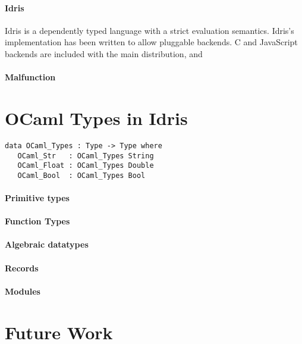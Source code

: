 \documentclass[a4paper,twocolumn]{article}
\begin{document}
\paragraph{Idris}

Idris \cite{idris} is a dependently typed language with a strict
evaluation semantics. Idris's implementation has been written to allow
pluggable backends. C and JavaScript backends are included with the
main distribution, and

\paragraph{Malfunction}



\section{OCaml Types in Idris}

\begin{lstlisting}
data OCaml_Types : Type -> Type where
   OCaml_Str   : OCaml_Types String
   OCaml_Float : OCaml_Types Double
   OCaml_Bool  : OCaml_Types Bool
\end{lstlisting}

\paragraph{Primitive types}



\paragraph{Function Types}

\paragraph{Algebraic datatypes}

\paragraph{Records}

\paragraph{Modules}

\section{Future Work}
\end{document}
